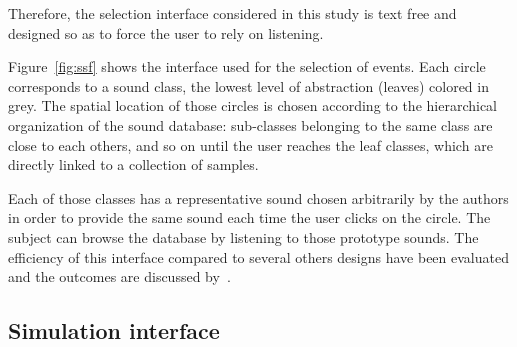 \documentclass[12pt]{elsarticle}
\begin{document}

Therefore, the selection interface considered in this study is text free and designed so as to force the user to rely on listening.


Figure~\ref{fig:ssf} shows the interface used for the selection of events. Each circle corresponds to a sound class, the lowest level of abstraction (leaves) colored in grey. The spatial location of those circles is chosen according to the hierarchical organization of the sound database: sub-classes belonging to the same class are close to each others, and so on until the user reaches the leaf classes, which are directly linked to a collection of samples.


Each of those classes has a representative sound chosen arbitrarily by the authors in order to provide the same sound each time the user clicks on the circle. The subject can browse the database by listening to those prototype sounds. The efficiency of this interface compared to several others designs have been evaluated and the outcomes are discussed by~\cite{lafay2016JAES}.

\subsection{Simulation interface}
\end{document}
